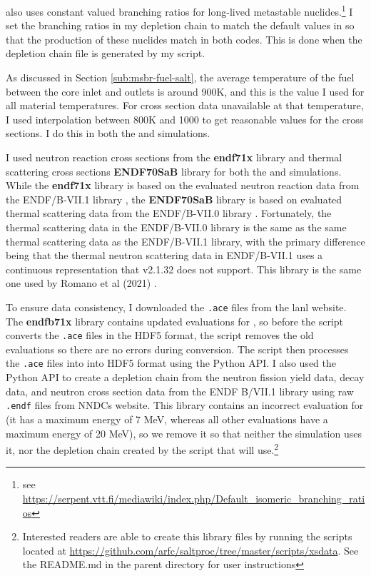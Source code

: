 \SerpentTWO also uses constant valued branching ratios for long-lived metastable
nuclides.\footnote{see \url{https://serpent.vtt.fi/mediawiki/index.php/Default_isomeric_branching_ratios}}
I set the branching ratios in my \OpenMC depletion chain to match the default
values in
\SerpentTWO so that the production of these nuclides match in both codes.
This is done when the depletion chain file is generated by my script.

As discussed in Section \ref{sub:msbr-fuel-salt}, the average temperature of the
fuel between the core inlet and outlets is around 900K, and this is the value I used
for all material temperatures. For cross section data
unavailable at that temperature, I used interpolation between 800K and 1000
to get reasonable values for the cross sections. I do this in both the \OpenMC
and \SerpentTWO simulations.

I used neutron reaction cross sections from the {\bf endf71x} \cite{conlin_continuous_2013} library and
thermal scattering cross sections {\bf ENDF70SaB} \cite{trellue_release_2008} library
for both the \SerpentTWO and \OpenMC simulations. While the
{\bf endf71x} library is based on the evaluated neutron reaction data from the ENDF/B-VII.1 library \cite{chadwick_endf/b-vii.1_2011},
the {\bf ENDF70SaB} library is based on evaluated thermal scattering data from the ENDF/B-VII.0 library \cite{chadwick_endfb-vii0_2006}.
Fortunately, the thermal scattering data in the ENDF/B-VII.0 library is the same as the same thermal
scattering data as the ENDF/B-VII.1 library, with the primary difference being that the thermal
neutron scattering data in ENDF/B-VII.1 uses a continuous representation
that \SerpentTWO v2.1.32 does not support. This library is the same one used
by Romano et al (2021) \cite{romano_depletion_2021}.

To ensure data consistency, I downloaded the \verb,.ace, files from the \Gls{lanl}
website. The {\bf endfb71x} library contains updated evaluations for , so
before the script converts the \verb,.ace, files in the HDF5 format,
the script removes the old  evaluations so there are no errors
during conversion. The script then processes the \verb,.ace, files into
into HDF5 format using the \OpenMC Python
API. I also used the Python API to create a depletion chain from the
neutron fission yield data, decay data, and neutron cross
section data from the ENDF B/VII.1 library using raw \verb,.endf, files from
NNDCs website. This library contains an incorrect evaluation for 
(it has a maximum energy of 7 MeV, whereas all other evaluations have a maximum energy
of 20 MeV), so we remove it so that neither the \SerpentTWO simulation uses it,
nor the depletion chain created by the script that \OpenMC will use.\footnote{Interested readers are able to
create this library files by running the scripts located at
\url{https://github.com/arfc/saltproc/tree/master/scripts/xsdata}. See
the README.md in the parent directory for user instructions}

